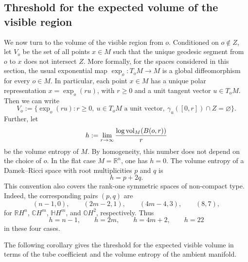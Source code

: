 \documentclass[11pt,a4paper]{article}
\theoremstyle{plain}
\theoremstyle{definition}
\theoremstyle{remark}
\newcommand{\vol}{\mathop{\mathrm{vol}}\nolimits}
\def\CC{\mathbb{C}}
\def\RR{\mathbb{R}}
\begin{document}
\subsection{Threshold for the expected volume of the visible region}

We now turn to the volume of the visible region from \(o\). Conditioned on
\(o\notin Z\), let \(V_o\) be the set of all points \(x\in M\) such that the unique
geodesic segment from \(o\) to \(x\) does not intersect \(Z\).  More formally, for the spaces considered in this section, the usual exponential map
\(\exp_o:T_oM\to M\) is a global diffeomorphism for every \(o\in M\).
In particular, each point \(x\in M\) has a unique polar representation
\(x=\exp_o(ru)\), with \(r\geq 0\) and a unit tangent vector \(u\in T_oM\). Then we can write
\[
V_o
:=
\bigl\{\exp_o(ru): r\geq 0,\ u\in T_oM \text{ a unit vector},\ 
\gamma_u([0,r])\cap Z=\varnothing\bigr\}.
\]
Further, let
\[
h
:=
\lim_{r\to\infty}{\log\vol_M(B(o,r))\over r}
\]
be the volume entropy of \(M\). By homogeneity, this number does not depend on the choice of
\(o\). In the flat case \(M=\RR^n\), one has \(h=0\). {The volume entropy of a Damek--Ricci space with
root multiplicities \(p\) and \(q\) is
\[
h=p+2q .
\]
This convention also covers the rank-one symmetric spaces of non-compact type.
Indeed, the corresponding pairs \((p,q)\) are
\[
(n-1,0),\qquad (2m-2,1),\qquad (4m-4,3),\qquad (8,7),
\]
for \(\RR H^n\), \(\CC H^m\), \(\mathbb H H^m\), and \(\mathbb O H^2\),
respectively. Thus
\[
h=n-1,\qquad h=2m,\qquad h=4m+2,\qquad h=22
\]
in these four cases.}

The following corollary gives the threshold for the expected visible volume in terms of the tube coefficient and the volume entropy of the ambient manifold.
\end{document}
